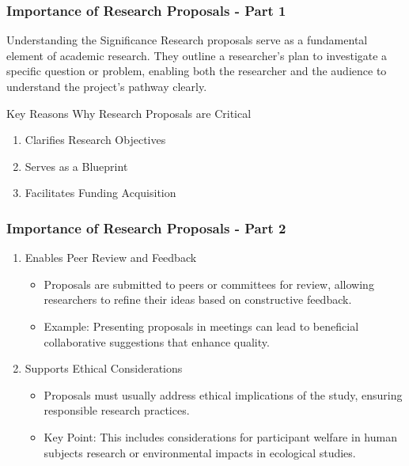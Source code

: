 \documentclass[aspectratio=169]{beamer}
\begin{document}
\begin{frame}[fragile]
    \frametitle{Importance of Research Proposals - Part 1}
    \begin{block}{Understanding the Significance}
        Research proposals serve as a fundamental element of academic research. They outline a researcher’s plan to investigate a specific question or problem, enabling both the researcher and the audience to understand the project’s pathway clearly.
    \end{block}

    \begin{block}{Key Reasons Why Research Proposals are Critical}
        \begin{enumerate}
            \item Clarifies Research Objectives
            \item Serves as a Blueprint
            \item Facilitates Funding Acquisition
        \end{enumerate}
    \end{block}
\end{frame}

\begin{frame}[fragile]
    \frametitle{Importance of Research Proposals - Part 2}
    \begin{enumerate}[resume]
        \item Enables Peer Review and Feedback
            \begin{itemize}
                \item Proposals are submitted to peers or committees for review, allowing researchers to refine their ideas based on constructive feedback.
                \item Example: Presenting proposals in meetings can lead to beneficial collaborative suggestions that enhance quality.
            \end{itemize}
        \item Supports Ethical Considerations
            \begin{itemize}
                \item Proposals must usually address ethical implications of the study, ensuring responsible research practices.
                \item Key Point: This includes considerations for participant welfare in human subjects research or environmental impacts in ecological studies.
            \end{itemize}
    \end{enumerate}
\end{frame}
\end{document}
